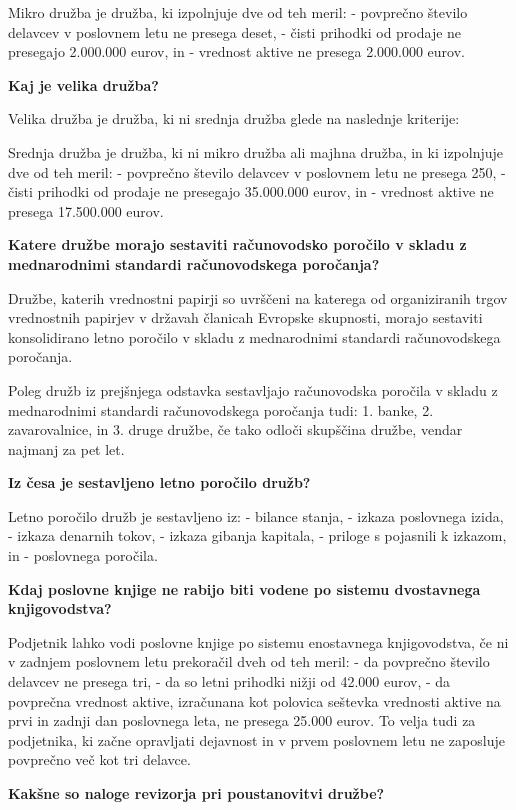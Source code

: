 \documentclass[a4paper,12pt,openright]{book}
\begin{document}
Mikro družba je družba, ki izpolnjuje dve od teh meril:
- povprečno število delavcev v poslovnem letu ne presega deset,
- čisti prihodki od prodaje ne presegajo 2.000.000 eurov, in
- vrednost aktive ne presega 2.000.000 eurov.

\textbf{Kaj je velika družba?}

Velika družba je družba, ki ni srednja družba glede na naslednje kriterije:

Srednja družba je družba, ki ni mikro družba ali majhna družba, in ki izpolnjuje dve od teh meril:
- povprečno število delavcev v poslovnem letu ne presega 250,
- čisti prihodki od prodaje ne presegajo 35.000.000 eurov, in
- vrednost aktive ne presega 17.500.000 eurov.

\textbf{Katere družbe morajo sestaviti računovodsko poročilo v skladu z mednarodnimi standardi računovodskega poročanja?}

Družbe, katerih vrednostni papirji so uvrščeni na katerega od organiziranih trgov vrednostnih papirjev v državah članicah Evropske skupnosti, morajo sestaviti konsolidirano letno poročilo v skladu z mednarodnimi standardi računovodskega poročanja.

Poleg družb iz prejšnjega odstavka sestavljajo računovodska poročila v skladu z mednarodnimi standardi računovodskega poročanja tudi:
1. banke,
2. zavarovalnice, in
3. druge družbe, če tako odloči skupščina družbe, vendar najmanj za pet let.

\textbf{Iz česa je sestavljeno letno poročilo družb?}

Letno poročilo družb je sestavljeno iz:
- bilance stanja,
- izkaza poslovnega izida,
- izkaza denarnih tokov,
- izkaza gibanja kapitala,
- priloge s pojasnili k izkazom, in
- poslovnega poročila.

\textbf{Kdaj poslovne knjige ne rabijo biti vodene po sistemu dvostavnega knjigovodstva?}

Podjetnik lahko vodi poslovne knjige po sistemu enostavnega knjigovodstva, če ni v zadnjem poslovnem letu prekoračil dveh od teh meril:
- da povprečno število delavcev ne presega tri,
- da so letni prihodki nižji od 42.000 eurov,
- da povprečna vrednost aktive, izračunana kot polovica seštevka vrednosti aktive na prvi in zadnji dan poslovnega leta, ne presega 25.000 eurov. To velja tudi za podjetnika, ki začne opravljati dejavnost in v prvem poslovnem letu ne zaposluje povprečno več kot tri delavce.

\textbf{Kakšne so naloge revizorja pri poustanovitvi družbe?}
\end{document}
